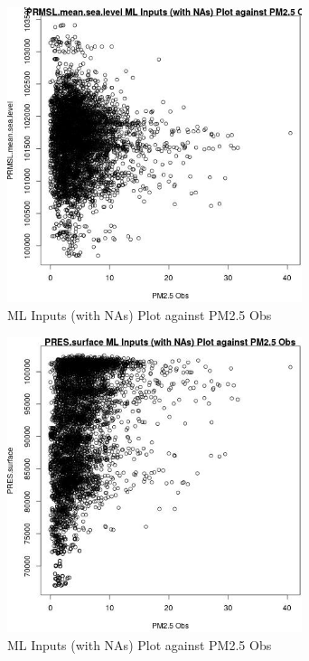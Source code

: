 \begin{figure} 
\centering  
\includegraphics[width=0.77\textwidth]{Code_Outputs/Report_ML_input_PM25_Step4_part_e_de_duplicated_aveswNAs_PRMSLmeansealevelvPM25_Obs.jpg} 
\caption{\label{fig:Report_ML_input_PM25_Step4_part_e_de_duplicated_aveswNAsPRMSLmeansealevelvPM25_Obs}ML Inputs (with NAs) Plot against PM2.5 Obs} 
\end{figure} 
 

\begin{figure} 
\centering  
\includegraphics[width=0.77\textwidth]{Code_Outputs/Report_ML_input_PM25_Step4_part_e_de_duplicated_aveswNAs_PRESsurfacevPM25_Obs.jpg} 
\caption{\label{fig:Report_ML_input_PM25_Step4_part_e_de_duplicated_aveswNAsPRESsurfacevPM25_Obs}ML Inputs (with NAs) Plot against PM2.5 Obs} 
\end{figure} 
 

